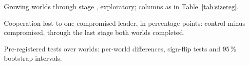 \begin{table}[!htbp]
\centering
\caption{Growing worlds through stage \ExploreHorizon{}, exploratory; columns as in Table~\ref{tab:sizereg}.}
\label{tab:size}
\footnotesize

\end{table}


\begin{table}[!htbp]
\centering
\caption{Cooperation lost to one compromised leader, in percentage points: control minus compromised, through the last stage both worlds completed.}
\label{tab:spread}
\footnotesize

\end{table}


\begin{table}[!htbp]
\centering
\caption{Pre-registered tests over \NWorlds{} worlds: per-world differences, sign-flip
tests and 95\,\% bootstrap intervals.}
\label{tab:prereg}
\footnotesize

\end{table}
